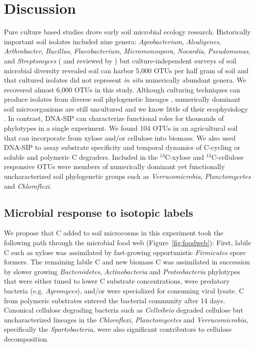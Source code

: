\section{Discussion}
Pure culture based studies drove early soil microbial ecology research.
Historically important soil isolates included nine genera:
\textit{Agrobacterium}, \textit{Alcaligenes}, \textit{Arthrobacter},
\textit{Bacillus}, \textit{Flavobacterium}, \textit{Micromonospora},
\textit{Nocardia}, \textit{Pseudomonas}, and \textit{Streptomyces}
(\citep{Alexander1977} and reviewed by \citep{Janssen2006}) but
culture-independent surveys of soil microbial diversity revealed soil can
harbor 5,000 OTUs per half gram of soil \citep{Schloss2006} and that cultured
isolates did not represent \textit{in situ} numerically abundant genera. We
recovered almost 6,000 OTUs in this study. Although culturing techniques can
produce isolates from diverse soil phylogenetic lineages \citep{Janssen2002},
numerically dominant soil microorganisms are still uncultured and we know
little of their ecophysiology \citep{Janssen2006}. In contrast, DNA-SIP can
characterize functional roles for thousands of phylotypes in a single
experiment. We found 104 OTUs in an agricultural soil that can incorporate
from xylose and/or cellulose into biomass. We also used DNA-SIP to assay
substrate specificity and temporal dynamics of C-cycling or soluble and
polymeric C degraders. Included in the $^{13}$C-xylose and $^{13}$C-cellulose
responsive OTUs were members of numerically dominant yet functionally
uncharacterized soil phylogenetic groups such as \textit{Verrucomicrobia},
\textit{Planctomycetes} and \textit{Chloroflexi}.

\subsection{Microbial response to isotopic labels}
We propose that C added to soil microcosms in this experiment took the
following path through the microbial food web (Figure~\ref{fig:foodweb}):
First, labile C such as xylose was assimilated by fast-growing opportunistic
\textit{Firmicutes} spore formers. The remaining labile C and new biomass C was
assimilated in succession by slower growing \textit{Bacteroidetes},
\textit{Actinobacteria} and \textit{Proteobacteria} phylotypes that were either
tuned to lower C substrate concentrations, were predatory bacteria (e.g.
\textit{Agromyces}), and/or were specialized for consuming viral lysate. C from
polymeric substrates entered the bacterial community after 14 days. Canonical
cellulose degrading bacteria such as \textit{Cellvibrio} degraded cellulose
but uncharacterized lineages in the \textit{Chloroflexi},
\textit{Planctomycetes} and \textit{Verrucomicrobia}, specifically the
\textit{Spartobacteria}, were also significant contributors to cellulose
decomposition. 

